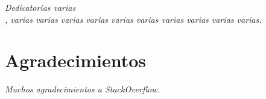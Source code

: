 
\thispagestyle{empty}
\vspace*{4cm}
\begin{flushright}           %
\textit{Dedicatorias varias \\,   
varias varias varias varias varias varias varias varias varias varias.}
\end{flushright}




\cleardoublepage
\chapter*{Agradecimientos}  %


\vspace{10mm}
\textit{Muchos agradecimientos a StackOverflow.}

